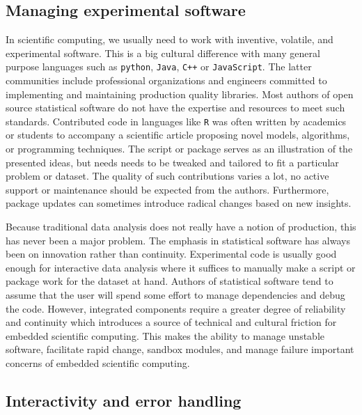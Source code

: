 \subsection{Managing experimental software}

In scientific computing, we usually need to work with inventive, volatile, and experimental software. This is a big cultural difference with many general purpose languages such as \texttt{python}, \texttt{Java}, \texttt{C++} or \texttt{JavaScript}. The latter communities include professional organizations and engineers committed to implementing and maintaining production quality libraries. Most authors of open source statistical software do not have the expertise and resources to meet such standards. Contributed code in languages like \texttt{R} was often written by academics or students to accompany a scientific article proposing novel models, algorithms, or programming techniques. The script or package serves as an illustration of the presented ideas, but needs needs to be tweaked and tailored to fit a particular problem or dataset. The quality of such contributions varies a lot, no active support or maintenance should be expected from the authors. Furthermore, package updates can sometimes introduce radical changes based on new insights. 

Because traditional data analysis does not really have a notion of production, this has never been a major problem. The emphasis in statistical software has always been on innovation rather than continuity. Experimental code is usually good enough for interactive data analysis where it suffices to manually make a script or package work for the dataset at hand.
Authors of statistical software tend to assume that the user will spend some effort to manage dependencies and debug the code. However, integrated components require a greater degree of reliability and continuity which introduces a source of technical and cultural friction for embedded scientific computing. 
This makes the ability to manage unstable software, facilitate rapid change, sandbox modules, and manage failure important concerns of embedded scientific computing.

\subsection{Interactivity and error handling}

